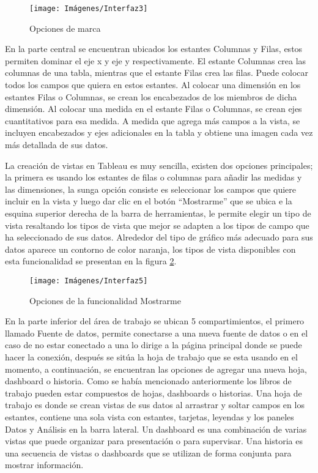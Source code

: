 \documentclass[
]{book}
\begin{document}
\begin{figure}

{\centering \texttt{[image: Imágenes/Interfaz3]} 

}

\caption{Opciones de marca}\label{fig:marcas-fig}
\end{figure}

En la parte central se encuentran ubicados los estantes Columnas y Filas, estos permiten dominar el eje x y eje y respectivamente. El estante Columnas crea las columnas de una tabla, mientras que el estante Filas crea las filas. Puede colocar todos los campos que quiera en estos estantes.
Al colocar una dimensión en los estantes Filas o Columnas, se crean los encabezados de los miembros de dicha dimensión. Al colocar una medida en el estante Filas o Columnas, se crean ejes cuantitativos para esa medida. A medida que agrega más campos a la vista, se incluyen encabezados y ejes adicionales en la tabla y obtiene una imagen cada vez más detallada de sus datos.

La creación de vistas en Tableau es muy sencilla, existen dos opciones principales; la primera es usando los estantes de filas o columnas para añadir las medidas y las dimensiones, la sunga opción consiste es seleccionar los campos que quiere incluir en la vista y luego dar clic en el botón ``Mostrarme'' que se ubica e la esquina superior derecha de la barra de herramientas, le permite elegir un tipo de vista resaltando los tipos de vista que mejor se adapten a los tipos de campo que ha seleccionado de sus datos. Alrededor del tipo de gráfico más adecuado para sus datos aparece un contorno de color naranja, los tipos de vista disponibles con esta funcionalidad se presentan en la figura \ref{fig:mostrarme-fig}.

\begin{figure}

{\centering \texttt{[image: Imágenes/Interfaz5]} 

}

\caption{Opciones de la funcionalidad Mostrarme}\label{fig:mostrarme-fig}
\end{figure}

En la parte inferior del área de trabajo se ubican 5 compartimientos, el primero llamado Fuente de datos, permite conectarse a una nueva fuente de datos o en el caso de no estar conectado a una lo dirige a la página principal donde se puede hacer la conexión, después se sitúa la hoja de trabajo que se esta usando en el momento, a continuación, se encuentran las opciones de agregar una nueva hoja, dashboard o historia. Como se había mencionado anteriormente los libros de trabajo pueden estar compuestos de hojas, dashboards o historias. Una hoja de trabajo es donde se crean vistas de sus datos al arrastrar y soltar campos en los estantes, contiene una sola vista con estantes, tarjetas, leyendas y los paneles Datos y Análisis en la barra lateral. Un dashboard es una combinación de varias vistas que puede organizar para presentación o para supervisar. Una historia es una secuencia de vistas o dashboards que se utilizan de forma conjunta para mostrar información.
\end{document}
